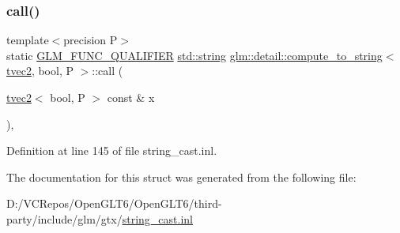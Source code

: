 \subsubsection{\texorpdfstring{call()}{call()}}
{\footnotesize\ttfamily template$<$precision P$>$ \\
static \mbox{\hyperlink{setup_8hpp_a33fdea6f91c5f834105f7415e2a64407}{G\+L\+M\+\_\+\+F\+U\+N\+C\+\_\+\+Q\+U\+A\+L\+I\+F\+I\+ER}} \mbox{\hyperlink{glad_8h_ac83513893df92266f79a515488701770}{std\+::string}} \mbox{\hyperlink{structglm_1_1detail_1_1compute__to__string}{glm\+::detail\+::compute\+\_\+to\+\_\+string}}$<$ \mbox{\hyperlink{structglm_1_1tvec2}{tvec2}}, bool, P $>$\+::call (\begin{DoxyParamCaption}\item[{\mbox{\hyperlink{structglm_1_1tvec2}{tvec2}}$<$ bool, P $>$ const \&}]{x }\end{DoxyParamCaption})\hspace{0.3cm}{\ttfamily [inline]}, {\ttfamily [static]}}



Definition at line 145 of file string\+\_\+cast.\+inl.



The documentation for this struct was generated from the following file\+:\begin{DoxyCompactItemize}
\item 
D\+:/\+V\+C\+Repos/\+Open\+G\+L\+T6/\+Open\+G\+L\+T6/third-\/party/include/glm/gtx/\mbox{\hyperlink{string__cast_8inl}{string\+\_\+cast.\+inl}}\end{DoxyCompactItemize}
